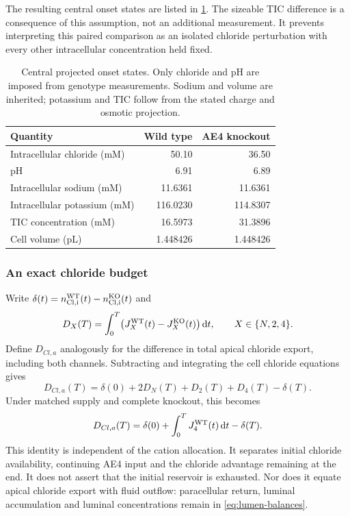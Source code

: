 \documentclass[11pt]{article}
\newcommand{\dd}{\mathrm{d}}
\begin{document}
The resulting central onset states are listed in \cref{tab:onset}. The sizeable TIC difference is a consequence of this assumption, not an additional measurement. It prevents interpreting this paired comparison as an isolated chloride perturbation with every other intracellular concentration held fixed.
\begin{table}[t]
\centering
\caption{Central projected onset states. Only chloride and pH are imposed from genotype measurements. Sodium and volume are inherited; potassium and TIC follow from the stated charge and osmotic projection.}
\label{tab:onset}
\begin{tabular}{lrr}
\toprule
Quantity & Wild type & AE4 knockout\\
\midrule
Intracellular chloride (mM) & 50.10 & 36.50\\
pH & 6.91 & 6.89\\
Intracellular sodium (mM) & 11.6361 & 11.6361\\
Intracellular potassium (mM) & 116.0230 & 114.8307\\
TIC concentration (mM) & 16.5973 & 31.3896\\
Cell volume (pL) & 1.448426 & 1.448426\\
\bottomrule
\end{tabular}
\end{table}

\subsubsection{An exact chloride budget}

Write $\delta(t)=n_{\rm Cl,i}^{\rm WT}(t)-n_{\rm Cl,i}^{\rm KO}(t)$ and
\begin{equation*}
 D_X(T)=\int_0^T\bigl(J_X^{\rm WT}(t)-J_X^{\rm KO}(t)\bigr)\,\dd t,
 \qquad X\in\{N,2,4\}.
\end{equation*}
Define $D_{Cl,a}$ analogously for the difference in total apical chloride export, including both channels. Subtracting and integrating the cell chloride equations gives
\begin{equation}
 D_{Cl,a}(T)=\delta(0)+2D_N(T)+D_2(T)+D_4(T)-\delta(T).
 \label{eq:reservoir-general}
\end{equation}
Under matched supply and complete knockout, this becomes
\begin{equation}
 D_{Cl,a}(T)=\delta(0)+\int_0^T J_4^{\rm WT}(t)\,\dd t-\delta(T).
 \label{eq:reservoir-matched}
\end{equation}
This identity is independent of the cation allocation. It separates initial chloride availability, continuing AE4 input and the chloride advantage remaining at the end. It does not assert that the initial reservoir is exhausted. Nor does it equate apical chloride export with fluid outflow: paracellular return, luminal accumulation and luminal concentrations remain in \cref{eq:lumen-balances}.
\end{document}
